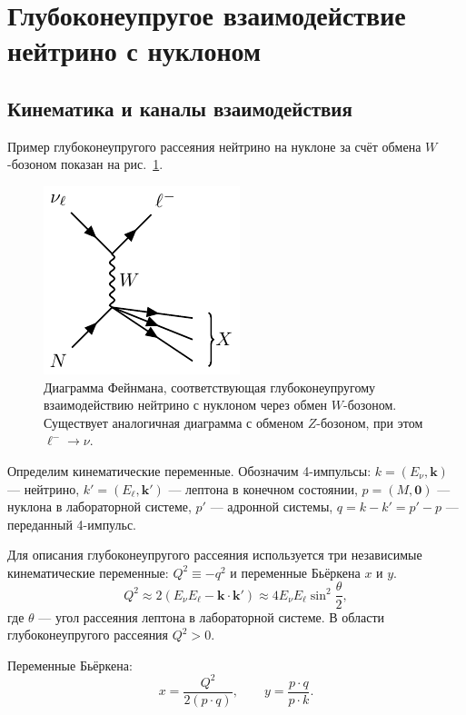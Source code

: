 \section{Глубоконеупругое взаимодействие нейтрино с нуклоном}
\subsection{Кинематика и каналы взаимодействия}

Пример глубоконеупругого рассеяния нейтрино на нуклоне за счёт обмена $W$-бозоном показан на рис.~\ref{fig:DIS}. 

\begin{figure}[!h]
\centering
\includegraphics[width=0.4\linewidth]{images/neutrino-nucleon-dis.pdf}
\caption{Диаграмма Фейнмана, соответствующая глубоконеупругому взаимодействию нейтрино с нуклоном через обмен $W$-бозоном. Существует аналогичная диаграмма с обменом $Z$-бозоном, при этом $\ell^- \to \nu$.}
\label{fig:DIS}
\end{figure}

Определим кинематические переменные. Обозначим 4-импульсы: 
$k = (E_\nu, \bm{k})$ — нейтрино, 
$k' = (E_\ell, \bm{k}')$ — лептона в конечном состоянии, 
$p = (M, \bm{0})$ — нуклона в лабораторной системе, 
$p'$ — адронной системы, 
$q = k - k' = p' - p$ — переданный 4-импульс.

Для описания глубоконеупругого рассеяния используется три независимые кинематические переменные: \( Q^2 \equiv -q^2\) и переменные Бьёркена \( x \) и \( y \).
\begin{equation}
  Q^2 \approx 2(E_\nu E_\ell - \bm{k} \cdot \bm{k}') \approx 4E_\nu E_\ell \sin^2\!\frac{\theta}{2},
\end{equation}
где \( \theta \) — угол рассеяния лептона в лабораторной системе. В области глубоконеупругого рассеяния \( Q^2 > 0 \).

Переменные Бьёркена:
\begin{equation}
  x = \frac{Q^2}{2(p \cdot q)}, 
  \qquad 
  y = \frac{p \cdot q}{p \cdot k}.
\end{equation}

